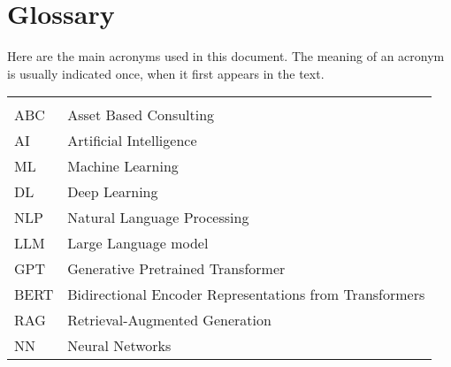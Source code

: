 \chapter*{Glossary}

Here are the main acronyms used in this document. The meaning of an acronym is usually indicated once, when it first appears in the text.

\begin{longtable}{lp{9cm}}
         &                                                         \\
    ABC  & Asset Based Consulting                                  \\
    AI   & Artificial Intelligence                                 \\
    ML   & Machine Learning                                        \\
    DL   & Deep Learning                                           \\
    NLP  & Natural Language Processing                             \\
    LLM  & Large Language model                                    \\
    GPT  & Generative Pretrained Transformer                       \\
    BERT & Bidirectional Encoder Representations from Transformers \\
    RAG  & Retrieval-Augmented Generation                          \\
    NN   & Neural Networks                                         \\
\end{longtable}
